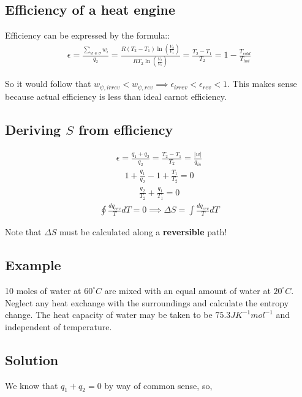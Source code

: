 \documentclass[12pt]{book}
\begin{document}
\subsection*{Efficiency of a heat engine}
Efficiency can be expressed by the formula::
\begin{align*}
    \epsilon=\frac{\sum_{w\in \sigma}w_i}{q_2}=\frac{R(T_2-T_1)\ln\left(\frac{V_2}{V_1}\right)}{RT_2\ln\left(\frac{V_2}{V_1}\right)}=\frac{T_2-T_1}{T_2}=1-\frac{T_{cold}}{T_{hot}}
\end{align*}

So it would follow that $w_{\psi,irrev}<w_{\psi,rev}\implies \epsilon_{irrev}<\epsilon_{rev}<1$. This makes sense because actual efficiency is less than ideal carnot efficiency.

\subsection*{Deriving $S$ from efficiency}

\begin{align*}
    \epsilon=\frac{q_1+q_2}{q_2}=\frac{T_2-T_1}{T_2}=\frac{|w|}{q_{in}}
\end{align*}
\begin{align*}
    1+\frac{q_1}{q_2}-1+\frac{T_1}{T_2}=0
\end{align*}
\begin{align*}
    \frac{q_2}{T_2}+\frac{q_1}{T_1}=0
\end{align*}
\begin{align*}
    \oint \frac{dq_{rev}}{T}dT=0\implies \Delta S=\int \frac{dq_{rev}}{T}dT
\end{align*}

Note that $\Delta S$ must be calculated along a \textbf{reversible} path!

\subsection*{Example}
10 moles of water at $60^{\circ}C$ are mixed with an equal amount of water at $20^{\circ}C$. Neglect any heat exchange with the surroundings and calculate the entropy change. The heat capacity of water may be
taken to be $75.3 JK^{-1}mol^{-1}$ and independent of temperature.

\subsection*{Solution}

We know that $q_1+q_2=0$ by way of common sense, so,
\end{document}
